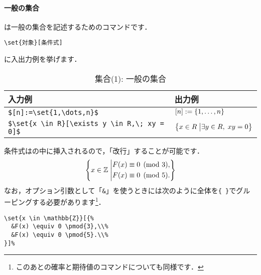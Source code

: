\documentclass[uplatex]{jsreport}
\begin{document}
\paragraph{一般の集合} は一般の集合を記述するためのコマンドです．\par
\begin{mdframed}[frametitle={基本形}, roundcorner=10pt, backgroundcolor=blue!10]
  \texttt{\textbackslash set\{対象\}[条件式]}
\end{mdframed}
に入出力例を挙げます．\par
\begin{table}[htbp]
  \centering
  \caption{集合(1): 一般の集合}
  \label{table:2.set1}
  \begin{tabular}{ll}\hline
    入力例 & 出力例 \\ \hline
    \verb|$[n]:=\set{1,\dots,n}$| & $[n]:=\set{1,\dots,n}$\\
    \verb|$\set{x \in R}[\exists y \in R,\; xy = 0]$| & $\set{x \in R}[\exists y \in R,\; xy = 0]$ \\\hline
  \end{tabular}
\end{table}\par
条件式はの中に挿入されるので，「改行」することが可能です．
\begin{align*}
  \set{x \in \mathbb{Z}}[{%
    &F(x) \equiv 0 \pmod{3},\\%
    &F(x) \equiv 0 \pmod{5}.\\%
  }]%
\end{align*}
なお，オプション引数として「\verb|&|」を使うときには次のように全体を\verb|{ }|でグルーピングする必要があります\footnote{このあとの確率と期待値のコマンドについても同様です．}．
\begin{verbatim}
\set{x \in \mathbb{Z}}[{%
  &F(x) \equiv 0 \pmod{3},\\%
  &F(x) \equiv 0 \pmod{5}.\\%
}]%
\end{verbatim}
\par
\end{document}

